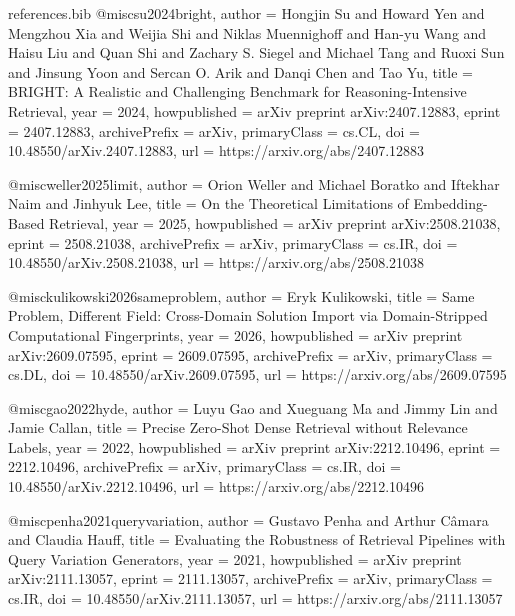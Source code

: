 \begin{filecontents*}{references.bib}
@misc{su2024bright,
  author        = {Hongjin Su and Howard Yen and Mengzhou Xia and Weijia Shi and Niklas Muennighoff and Han-yu Wang and Haisu Liu and Quan Shi and Zachary S. Siegel and Michael Tang and Ruoxi Sun and Jinsung Yoon and Sercan O. Arik and Danqi Chen and Tao Yu},
  title         = {{BRIGHT: A Realistic and Challenging Benchmark for Reasoning-Intensive Retrieval}},
  year          = {2024},
  howpublished  = {arXiv preprint arXiv:2407.12883},
  eprint        = {2407.12883},
  archivePrefix = {arXiv},
  primaryClass  = {cs.CL},
  doi           = {10.48550/arXiv.2407.12883},
  url           = {https://arxiv.org/abs/2407.12883}
}

@misc{weller2025limit,
  author        = {Orion Weller and Michael Boratko and Iftekhar Naim and Jinhyuk Lee},
  title         = {{On the Theoretical Limitations of Embedding-Based Retrieval}},
  year          = {2025},
  howpublished  = {arXiv preprint arXiv:2508.21038},
  eprint        = {2508.21038},
  archivePrefix = {arXiv},
  primaryClass  = {cs.IR},
  doi           = {10.48550/arXiv.2508.21038},
  url           = {https://arxiv.org/abs/2508.21038}
}

@misc{kulikowski2026sameproblem,
  author        = {Eryk Kulikowski},
  title         = {{Same Problem, Different Field: Cross-Domain Solution Import via Domain-Stripped Computational Fingerprints}},
  year          = {2026},
  howpublished  = {arXiv preprint arXiv:2609.07595},
  eprint        = {2609.07595},
  archivePrefix = {arXiv},
  primaryClass  = {cs.DL},
  doi           = {10.48550/arXiv.2609.07595},
  url           = {https://arxiv.org/abs/2609.07595}
}

@misc{gao2022hyde,
  author        = {Luyu Gao and Xueguang Ma and Jimmy Lin and Jamie Callan},
  title         = {{Precise Zero-Shot Dense Retrieval without Relevance Labels}},
  year          = {2022},
  howpublished  = {arXiv preprint arXiv:2212.10496},
  eprint        = {2212.10496},
  archivePrefix = {arXiv},
  primaryClass  = {cs.IR},
  doi           = {10.48550/arXiv.2212.10496},
  url           = {https://arxiv.org/abs/2212.10496}
}

@misc{penha2021queryvariation,
  author        = {Gustavo Penha and Arthur C{\^a}mara and Claudia Hauff},
  title         = {{Evaluating the Robustness of Retrieval Pipelines with Query Variation Generators}},
  year          = {2021},
  howpublished  = {arXiv preprint arXiv:2111.13057},
  eprint        = {2111.13057},
  archivePrefix = {arXiv},
  primaryClass  = {cs.IR},
  doi           = {10.48550/arXiv.2111.13057},
  url           = {https://arxiv.org/abs/2111.13057}
}



\end{filecontents*}

